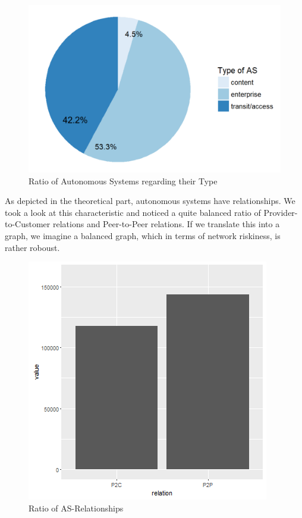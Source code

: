 \documentclass[conference]{IEEEtran}
\begin{document}
\begin{figure}[htbp]
\centerline{\includegraphics[scale=0.4]{Graphics/typeofAS.PNG}}
\caption{Ratio of Autonomous Systems regarding their Type }
\label{fig}
\end{figure}

As depicted in the theoretical part, autonomous systems have relationships. We took a look at this characteristic and noticed a quite balanced ratio of Provider-to-Customer relations and Peer-to-Peer relations. If we translate this into a graph, we imagine a balanced graph, which in terms of network riskiness, is rather roboust. 

\begin{figure}[htbp]
\centerline{\includegraphics[scale=0.4]{Graphics/relationspeerandprovider.png}}
\caption{Ratio of AS-Relationships }
\label{fig}
\end{figure}
\end{document}
